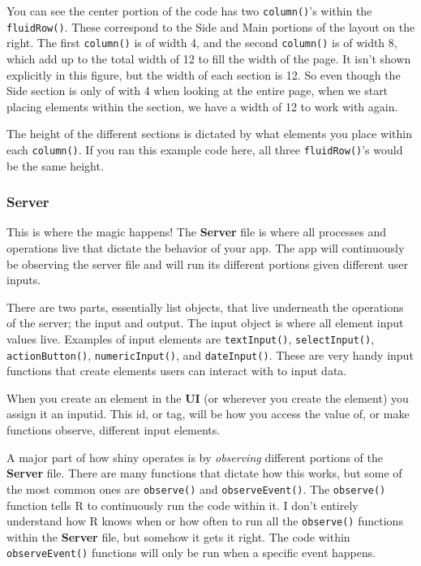 \documentclass[
]{article}
\begin{document}
You can see the center portion of the code has two \texttt{column()}'s
within the \texttt{fluidRow()}. These correspond to the Side and Main
portions of the layout on the right. The first \texttt{column()} is of
width 4, and the second \texttt{column()} is of width 8, which add up to
the total width of 12 to fill the width of the page. It isn't shown
explicitly in this figure, but the width of each section is 12. So even
though the Side section is only of with 4 when looking at the entire
page, when we start placing elements within the section, we have a width
of 12 to work with again.

The height of the different sections is dictated by what elements you
place within each \texttt{column()}. If you ran this example code here,
all three \texttt{fluidRow()}'s would be the same height.

\subsubsection{Server}\label{server}

This is where the magic happens! The \textbf{Server} file is where all
processes and operations live that dictate the behavior of your app. The
app will continuously be observing the server file and will run its
different portions given different user inputs.

There are two parts, essentially list objects, that live underneath the
operations of the server; the input and output. The input object is
where all element input values live. Examples of input elements are
\texttt{textInput()}, \texttt{selectInput()}, \texttt{actionButton()},
\texttt{numericInput()}, and \texttt{dateInput()}. These are very handy
input functions that create elements users can interact with to input
data.

When you create an element in the \textbf{UI} (or wherever you create
the element) you assign it an inputid. This id, or tag, will be how you
access the value of, or make functions observe, different input
elements.

A major part of how shiny operates is by \emph{observing} different
portions of the \textbf{Server} file. There are many functions that
dictate how this works, but some of the most common ones are
\texttt{observe()} and \texttt{observeEvent()}. The \texttt{observe()}
function tells R to continuously run the code within it. I don't
entirely understand how R knows when or how often to run all the
\texttt{observe()} functions within the \textbf{Server} file, but
somehow it gets it right. The code within \texttt{observeEvent()}
functions will only be run when a specific event happens.
\end{document}
